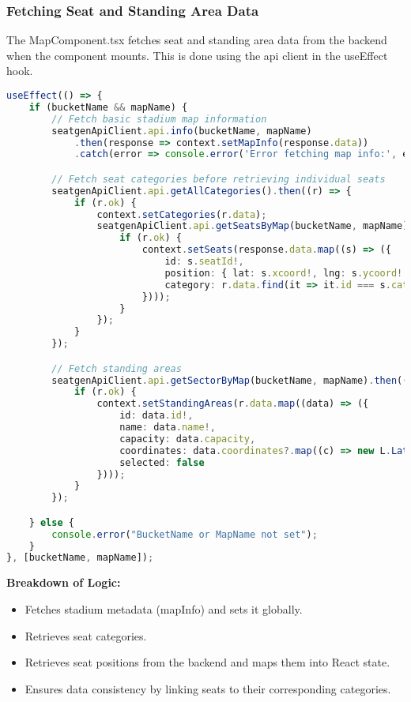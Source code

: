 \subsubsection{Fetching Seat and Standing Area Data}

The MapComponent.tsx fetches seat and standing area data from the backend when the component mounts. This is done using the api client in the useEffect hook.

\begin{lstlisting}[language=TypeScript, caption=Fetching Seat and Category Data, label=lst:fetch-seats]
useEffect(() => {
    if (bucketName && mapName) {
        // Fetch basic stadium map information
        seatgenApiClient.api.info(bucketName, mapName)
            .then(response => context.setMapInfo(response.data))
            .catch(error => console.error('Error fetching map info:', error));

        // Fetch seat categories before retrieving individual seats
        seatgenApiClient.api.getAllCategories().then((r) => {
            if (r.ok) {
                context.setCategories(r.data);
                seatgenApiClient.api.getSeatsByMap(bucketName, mapName).then(response => {
                    if (r.ok) {
                        context.setSeats(response.data.map((s) => ({
                            id: s.seatId!,
                            position: { lat: s.xcoord!, lng: s.ycoord! },
                            category: r.data.find(it => it.id === s.categoryId) ?? null
                        })));
                    }
                });
            }
        });

        // Fetch standing areas
        seatgenApiClient.api.getSectorByMap(bucketName, mapName).then((r) => {
            if (r.ok) {
                context.setStandingAreas(r.data.map((data) => ({
                    id: data.id!,
                    name: data.name!,
                    capacity: data.capacity,
                    coordinates: data.coordinates?.map((c) => new L.LatLng(c.x!, c.y!)) ?? [],
                    selected: false
                })));
            }
        });

    } else {
        console.error("BucketName or MapName not set");
    }
}, [bucketName, mapName]);
\end{lstlisting}

\textbf{Breakdown of Logic:}
\begin{itemize}
    \item Fetches stadium metadata (mapInfo) and sets it globally.
    \item Retrieves seat categories.
    \item Retrieves seat positions from the backend and maps them into React state.
    \item Ensures data consistency by linking seats to their corresponding categories.
\end{itemize}

